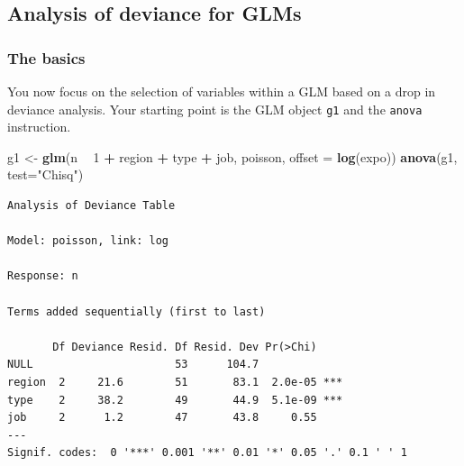 \documentclass[
]{book}
\newenvironment{Shaded}{\begin{snugshade}}{\end{snugshade}}
\newcommand{\DataTypeTok}[1]{\textcolor[rgb]{0.13,0.29,0.53}{#1}}
\newcommand{\DecValTok}[1]{\textcolor[rgb]{0.00,0.00,0.81}{#1}}
\newcommand{\KeywordTok}[1]{\textcolor[rgb]{0.13,0.29,0.53}{\textbf{#1}}}
\newcommand{\NormalTok}[1]{#1}
\newcommand{\OperatorTok}[1]{\textcolor[rgb]{0.81,0.36,0.00}{\textbf{#1}}}
\newcommand{\StringTok}[1]{\textcolor[rgb]{0.31,0.60,0.02}{#1}}
\begin{document}
\hypertarget{analysis-of-deviance-for-glms}{%
\subsection{Analysis of deviance for GLMs}\label{analysis-of-deviance-for-glms}}

\hypertarget{the-basics}{%
\subsubsection{The basics}\label{the-basics}}

You now focus on the selection of variables within a GLM based on a drop in deviance analysis. Your starting point is the GLM object \texttt{g1} and the \texttt{anova} instruction.

\begin{Shaded}
\begin{Highlighting}[]
\NormalTok{g1 <-}\StringTok{ }\KeywordTok{glm}\NormalTok{(n }\OperatorTok{~}\StringTok{ }\DecValTok{1} \OperatorTok{+}\StringTok{ }\NormalTok{region }\OperatorTok{+}\StringTok{ }\NormalTok{type }\OperatorTok{+}\StringTok{ }\NormalTok{job, poisson, }\DataTypeTok{offset =} \KeywordTok{log}\NormalTok{(expo))}
\KeywordTok{anova}\NormalTok{(g1, }\DataTypeTok{test=}\StringTok{"Chisq"}\NormalTok{)}
\end{Highlighting}
\end{Shaded}

\begin{verbatim}
Analysis of Deviance Table

Model: poisson, link: log

Response: n

Terms added sequentially (first to last)

       Df Deviance Resid. Df Resid. Dev Pr(>Chi)    
NULL                      53      104.7             
region  2     21.6        51       83.1  2.0e-05 ***
type    2     38.2        49       44.9  5.1e-09 ***
job     2      1.2        47       43.8     0.55    
---
Signif. codes:  0 '***' 0.001 '**' 0.01 '*' 0.05 '.' 0.1 ' ' 1
\end{verbatim}
\end{document}
